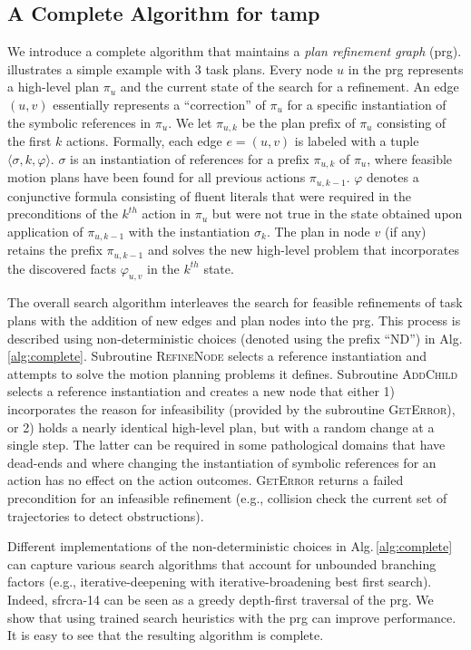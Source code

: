 \subsection{A Complete Algorithm for {\sc tamp}}
We introduce a complete algorithm that maintains a \emph{plan
  refinement graph} ({\sc prg}).  illustrates a simple
example with 3 task plans.  Every node $u$ in the {\sc prg} represents
a high-level plan $\pi_u$ and the current state of the search for a
refinement. An edge $(u,v)$ essentially represents a ``correction'' of
$\pi_u$ for a specific instantiation of the symbolic references in
$\pi_u$. We let $\pi_{u,k}$ be the plan prefix of $\pi_u$ consisting
of the first $k$ actions. Formally, each edge $e=(u,v)$ is labeled
with a tuple $\langle \sigma, k, \varphi \rangle$.  $\sigma$ is an
instantiation of references for a prefix $\pi_{u,k}$ of $\pi_u$, where
feasible motion plans have been found for all previous actions
$\pi_{u,k-1}$. $\varphi$ denotes a conjunctive formula consisting of
fluent literals that were required in the preconditions of the
$k^{th}$ action in $\pi_u$ but were not true in the state obtained
upon application of $\pi_{u,k-1}$ with the instantiation $\sigma_k$.
The plan in node $v$ (if any) retains the prefix $\pi_{u,k-1}$ and
solves the new high-level problem that incorporates the discovered
facts $\varphi_{u,v}$ in the $k^{th}$ state.

The overall search algorithm interleaves the search for feasible
refinements of task plans with the addition of new edges and plan
nodes into the {\sc prg}. This process is described using
non-deterministic choices (denoted using the prefix ``ND'') in
Alg.\,\ref{alg:complete}. Subroutine \textsc{RefineNode} selects a
reference instantiation and attempts to solve the motion planning
problems it defines. Subroutine \textsc{AddChild} selects a reference
instantiation and creates a new node that either 1) incorporates the
reason for infeasibility (provided by the subroutine
\textsc{GetError}), or 2) holds a nearly identical high-level plan,
but with a random change at a single step.  The latter can be required
in some pathological domains that have dead-ends and where changing
the instantiation of symbolic references for an action has no effect
on the action outcomes. \textsc{GetError} returns a failed
precondition for an infeasible refinement (e.g., collision
check the current set of trajectories to detect obstructions).

Different implementations of the non-deterministic choices in
Alg.\,\ref{alg:complete} can capture various search algorithms that
account for unbounded branching factors (e.g., iterative-deepening
with iterative-broadening best first search). Indeed, {\sc sfrcra-14}
can be seen as a greedy depth-first traversal of the {\sc prg}. We
show that using trained search heuristics with the {\sc prg} can
improve performance. It is easy to see that the resulting algorithm is
complete.

